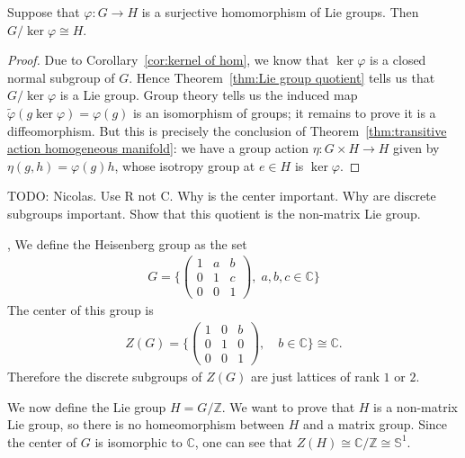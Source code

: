 \begin{theorem}
\label{thm:first iso}
Suppose that $\varphi: G \to H$ is a surjective homomorphism of Lie groups.
Then $G / \ker \varphi \cong H$.
\end{theorem}
\begin{proof}
Due to Corollary~\ref{cor:kernel of hom}, we know that $\ker \varphi$ is a closed normal subgroup of $G$.
Hence Theorem~\ref{thm:Lie group quotient} tells us that $G/\ker \varphi$ is a Lie group.
Group theory tells us the induced map $\tilde{\varphi}(g\ker\varphi) = \varphi(g)$ is an isomorphism of groups; it remains to prove it is a diffeomorphism.
But this is precisely the conclusion of Theorem~\ref{thm:transitive action homogeneous manifold}: we have a group action $\eta : G \times H \to H$ given by $\eta(g,h) = \varphi(g)h$, whose isotropy group at $e \in H$ is $\ker\varphi$.
\end{proof}

TODO: Nicolas. 
Use R not C.
Why is the center important.
Why are discrete subgroups important.
Show that this quotient is the non-matrix Lie group.

\begin{definition}
\textup{\cite[10.2]{Fulton2004}, \cite[4.8]{Hall2015}}
We define the Heisenberg group as the set
\begin{align*}
G = \Bigg\{\begin{pmatrix}
1 &a &b\\
0 &1 &c\\
0 &0 &1
\end{pmatrix}, \; a,b,c \in \mathbb{C} \Bigg\}
\end{align*} 
The center of this group is 
\begin{align*}
Z(G) = \Bigg\{\begin{pmatrix}
1 &0 &b\\
0 &1 &0\\
0 &0 &1
\end{pmatrix}, \quad b \in \mathbb{C}\Bigg\} \cong \mathbb{C}.
\end{align*}
Therefore the discrete subgroups of $Z(G)$ are just lattices of rank $1$ or $2$.
\end{definition}
We now define the Lie group $H = G / \mathbb{Z}$. We want to prove that $H$ is a non-matrix Lie group, so there is no homeomorphism between $H$ and a matrix group. Since the center of $G$ is isomorphic to $\mathbb{C}$, one can see that $Z(H) \cong \mathbb{C} / \mathbb{Z} \cong \mathbb{S}^1$. 




